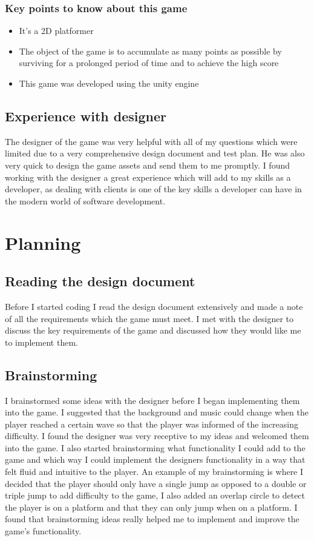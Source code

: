 \documentclass{report}
\begin{document}
 \subsection{Key points to know about this game}
 \begin{itemize}
     \item It's a 2D platformer
     \item The object of the game is to accumulate as many points as possible by surviving for a prolonged period of time and to achieve the high score
     \item This game was developed using the unity engine
 \end{itemize}
 \section{Experience with designer}
 The designer of the game was very helpful with all of my questions which were limited due to a very comprehensive design document and test plan.  He was also very quick to design the game assets and send them to me promptly.  I found working with the designer a great experience which will add to my skills as a developer, as dealing with clients is one of the key skills a developer can have in the modern world of software development.
\chapter{Planning}
\section{Reading the design document}
Before I started coding I read the design document extensively and made a note of all the requirements which the game must meet.  I met with the designer to discuss the key requirements of the game and discussed how they would like me to implement them.
\section{Brainstorming}
I brainstormed some ideas with the designer before I began implementing them into the game.  I suggested that the background and music could change when the player reached a certain wave so that the player was informed of the increasing difficulty.  I found the designer was very receptive to my ideas and welcomed them into the game. I also started brainstorming what functionality I could add to the game and which way I could implement the designers functionality in a way that felt fluid and intuitive to the player.  An example of my brainstorming is where I decided that the player should only have a single jump as opposed to a double or triple jump to add difficulty to the game, I also added an overlap circle to detect the player is on a platform and that they can only jump when on a platform.  I found that brainstorming ideas really helped me to implement and improve the game's functionality. 
\end{document}

